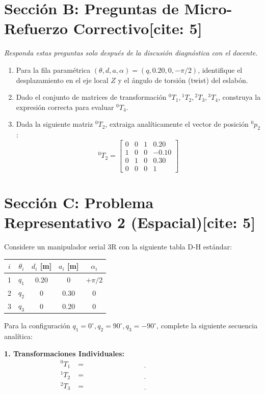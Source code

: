 \documentclass[11pt, a4paper]{article}
\begin{document}
\section*{Sección B: Preguntas de Micro-Refuerzo Correctivo[cite: 5]}
\textit{Responda estas preguntas solo después de la discusión diagnóstica con el docente.}
\begin{enumerate}
    \item Para la fila paramétrica $(\theta, d, a, \alpha) = (q, 0.20, 0, -\pi/2)$, identifique el desplazamiento en el eje local $Z$ y el ángulo de torsión (twist) del eslabón.
    \item Dado el conjunto de matrices de transformación ${}^0T_1, {}^1T_2, {}^2T_3, {}^3T_4$, construya la expresión correcta para evaluar ${}^0T_4$.
    \item Dada la siguiente matriz ${}^0T_2$, extraiga analíticamente el vector de posición ${}^0p_2$:
    \begin{equation*}
        {}^0T_2 = \begin{bmatrix} 0&0&1&0.20 \\ 1&0&0&-0.10 \\ 0&1&0&0.30 \\ 0&0&0&1 \end{bmatrix}
    \end{equation*}
\end{enumerate}

\newpage
\section*{Sección C: Problema Representativo 2 (Espacial)[cite: 5]}
Considere un manipulador serial 3R con la siguiente tabla D-H estándar:

\begin{center}
    \begin{tabular}{c c c c c}
    \toprule
    $i$ & $\theta_i$ & $d_i$ [m] & $a_i$ [m] & $\alpha_i$ \\ \midrule
    1 & $q_1$ & 0.20 & 0 & $+\pi/2$ \\
    2 & $q_2$ & 0 & 0.30 & 0 \\
    3 & $q_3$ & 0 & 0.20 & 0 \\ \bottomrule
    \end{tabular}
\end{center}

Para la configuración $q_1=0^\circ, q_2=90^\circ, q_3=-90^\circ$, complete la siguiente secuencia analítica:

\vspace{0.4cm}
\noindent \textbf{1. Transformaciones Individuales:}
\begin{align*}
    {}^0T_1 &= \underline{\hspace{7cm}} \\[1cm]
    {}^1T_2 &= \underline{\hspace{7cm}} \\[1cm]
    {}^2T_3 &= \underline{\hspace{7cm}}
\end{align*}
\end{document}
